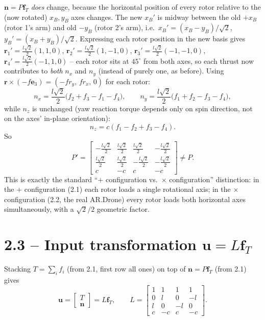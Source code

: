 \documentclass[11pt]{article}
\newcommand{\vect}[1]{\mathbf{#1}}
\begin{document}
$\vect{n} = P\vect{f}_T$ \emph{does} change, because the horizontal position of every rotor relative to the (now rotated) $x_B,y_B$ axes changes. The new $x_B'$ is midway between the old $+x_B$ (rotor 1's arm) and old $-y_B$ (rotor 2's arm), i.e.\ $x_B' = (x_B-y_B)/\sqrt2$, $y_B' = (x_B+y_B)/\sqrt2$. Expressing each rotor position in the new basis gives $\vect{r}_1' = \tfrac{l\sqrt2}{2}(1,1,0)$, $\vect{r}_2' = \tfrac{l\sqrt2}{2}(1,-1,0)$, $\vect{r}_3' = \tfrac{l\sqrt2}{2}(-1,-1,0)$, $\vect{r}_4' = \tfrac{l\sqrt2}{2}(-1,1,0)$ -- each rotor sits at $45^\circ$ from both axes, so each thrust now contributes to \emph{both} $n_x$ and $n_y$ (instead of purely one, as before). Using $\vect{r}\times(-f\vect{e}_3) = (-f r_y,\, f r_x,\, 0)$ for each rotor:
\[
n_x = \frac{l\sqrt2}{2}\big(f_2 + f_3 - f_1 - f_4\big), \qquad
n_y = \frac{l\sqrt2}{2}\big(f_1 + f_2 - f_3 - f_4\big),
\]
while $n_z$ is unchanged (yaw reaction torque depends only on spin direction, not on the axes' in-plane orientation):
\[
n_z = c(f_1-f_2+f_3-f_4).
\]
So
\[
P' = \begin{bmatrix}
-\frac{l\sqrt2}{2} & \frac{l\sqrt2}{2} & \frac{l\sqrt2}{2} & -\frac{l\sqrt2}{2} \\[4pt]
\frac{l\sqrt2}{2} & \frac{l\sqrt2}{2} & -\frac{l\sqrt2}{2} & -\frac{l\sqrt2}{2} \\[4pt]
c & -c & c & -c
\end{bmatrix} \neq P.
\]
This is exactly the standard ``$+$ configuration vs.\ $\times$ configuration'' distinction: in the $+$ configuration (2.1) each rotor loads a single rotational axis; in the $\times$ configuration (2.2, the real AR.Drone) every rotor loads both horizontal axes simultaneously, with a $\sqrt2/2$ geometric factor.

\section*{2.3 -- Input transformation $\vect{u} = L\vect{f}_T$}

Stacking $T=\sum_i f_i$ (from 2.1, first row all ones) on top of $\vect{n}=P\vect{f}_T$ (from 2.1) gives
\[
\vect{u} = \begin{bmatrix}T\\ \vect{n}\end{bmatrix} = L\vect{f}_T, \qquad
L = \begin{bmatrix} 1 & 1 & 1 & 1 \\ 0 & l & 0 & -l \\ l & 0 & -l & 0 \\ c & -c & c & -c \end{bmatrix}.
\]
\end{document}
